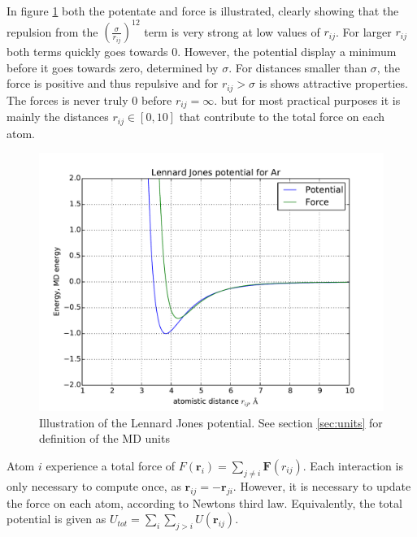 In figure \ref{fig:lj} both the potentate and force is illustrated, clearly showing that the repulsion from the $ \left(	\frac{\sigma}{r_{ij}}\right)^{12} $ term is very strong at low values of $ r_{ij}$. For larger $ r_{ij} $ both terms quickly goes towards 0. However, the potential display a minimum before it goes towards zero, determined by $ \sigma $. For distances smaller than $ \sigma $, the force is positive and thus repulsive and for $ r_{ij} >\sigma $ is shows attractive properties. The forces is never truly 0 before $ r_{ij}  = \infty$. but for most practical purposes it is mainly the distances $ r_{ij} \in [0,10] $ that contribute to the total force on each atom. 


\begin{figure}[H]
	\centering
	\includegraphics[width=0.7\linewidth]{../figures/LJ}
	\caption{Illustration of the Lennard Jones potential. See section \ref{sec:units} for definition of the MD units}
	\label{fig:lj}
\end{figure}


Atom $ i $ experience a total force of $ F(\textbf{r}_i) =  \sum\limits_{j\neq i}   \textbf{F}(r_{ij})$. Each interaction is only necessary to compute once, as $ \textbf{r}_{ij}  = - \textbf{r}_{ji} $. However, it is necessary to update the force on each atom, according to Newtons third law. Equivalently, the total potential is given as $ U_{tot} =  \sum\limits_{i} \sum\limits_{j>i} 	U(\textbf{r}_{ij}) $. 
